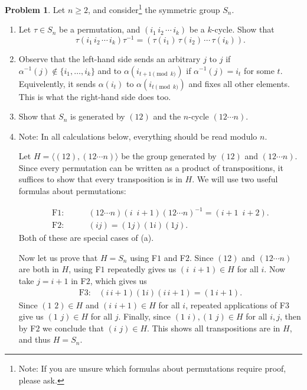 \documentclass[11pt]{article}
\makeatletter
\renewenvironment{proof}[1][\proofname]{\par
  \vspace{-\topsep}%
  \pushQED{\qed}%
  \normalfont
  \topsep0pt \partopsep0pt %
  \trivlist
  \item[\hskip\labelsep
        \itshape
    #1\@addpunct{.}]\ignorespaces
}{%
  \popQED\endtrivlist\@endpefalse
  \addvspace{6pt plus 6pt} %
}
\theoremstyle{definition}
\newtheorem{problem}{Problem}
\makeatother
\begin{document}
\begin{problem} Let $n\geq 2$, and consider\footnote{Note: If you are unsure which formulas about permutations require proof, please ask.} the symmetric group $S_n$.
	\begin{enumerate}[label=(\alph*)]
\item Let $\tau\in S_n$ be a permutation, and $(i_1 \, i_2 \, \cdots \, i_k)$ be a $k$-cycle. Show that 
\[ \tau (i_1 \, i_2 \, \cdots \, i_k)  \tau^{-1} = (\tau(i_1) \, \tau(i_2) \, \cdots \, \tau(i_k)).\]

\begin{proof}
Observe that the left-hand side sends an arbitrary $j$ to $j$ if $\alpha^{-1}(j) \notin \{i_1, \dots, i_k\}$
    and to $\alpha(i_{t+1 \pmod k})$ if $\alpha^{-1}(j)  = i_t$ for some $t$. Equivelently, it sends $\alpha(i_t)$ to $\alpha(i_{t \pmod k})$ and fixes all other elements. This is
      what the right-hand side does too.
      \end{proof}
\item Show that $S_n$ is generated by $(12)$ and the $n$-cycle $(12 \cdots n)$.
\begin{proof}
Note: In all calculations below, everything should be read modulo $n$. 

Let $H=\langle (12), (12\cdots n)\rangle$ be the group generated by $(12)$ and $(12\cdots n)$.  Since every permutation can be written as a product of transpositions, it suffices to show that every transposition is in $H$. We will use two useful formulas about permutations:

$$\begin{aligned}
\textrm{F}1: & \qquad (12\cdots n)(i\,\,\, i+1)(12\cdots n)^{-1}=(i+1\,\,\, i+2).\\
\textrm{F}2: & \qquad (ij) = (1j)(1i)(1j).
\end{aligned}$$
Both of these are special cases of (a).

 Now let us prove that $H = S_n$ using F$1$ and F$2$. Since $(12)$ and $(12\cdots n)$ are both in $H$, using F$1$ repeatedly gives us $(i \,\,\, i+1) \in H$ for all $i$. Now take $j = i+1$ in F$2$, which gives us
$$\begin{aligned} \textrm{F}3: & (i\, i+1)(1i)(i\, i+1)=(1\, i+1). \end{aligned}$$
Since $(1 \,\, 2) \in H$ and $(i \, \, i+1) \in H$ for all $i$, repeated applications of F$3$ give us $(1 \,\, j) \in H$ for all $j$. Finally, since $(1 \,\, i), (1 \, \, j) \in H$ for all $i, j$, then by F$2$ we conclude that $(i \,\, j) \in H$. This shows all transpositions are in $H$, and thus $H = S_n$.
\end{proof}



\end{enumerate}
\end{problem}
\end{document}
